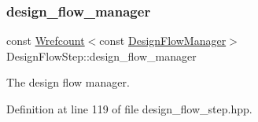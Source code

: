 \mbox{\label{classDesignFlowStep_ab770677ddf087613add30024e16a5554}} 
\subsubsection{\texorpdfstring{design\+\_\+flow\+\_\+manager}{design\_flow\_manager}}
{\footnotesize\ttfamily const \hyperlink{classWrefcount}{Wrefcount}$<$const \hyperlink{classDesignFlowManager}{Design\+Flow\+Manager}$>$ Design\+Flow\+Step\+::design\+\_\+flow\+\_\+manager\hspace{0.3cm}{\ttfamily [protected]}}



The design flow manager. 



Definition at line 119 of file design\+\_\+flow\+\_\+step.\+hpp.



